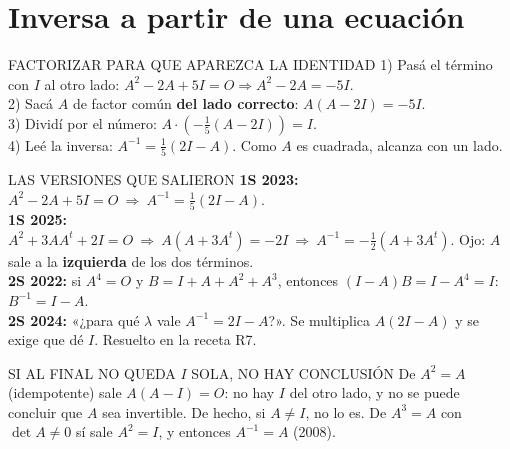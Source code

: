 \section{Inversa a partir de una ecuación}
\begin{metodo}{FACTORIZAR PARA QUE APAREZCA LA IDENTIDAD}
1) Pasá el término con $I$ al otro lado: $A^2-2A+5I=O\Rightarrow A^2-2A=-5I$.\\
2) Sacá $A$ de factor común \textbf{del lado correcto}: $A(A-2I)=-5I$.\\
3) Dividí por el número: $A\cdot\left(-\frac15(A-2I)\right)=I$.\\
4) Leé la inversa: $A^{-1}=\frac15(2I-A)$. Como $A$ es cuadrada, alcanza con un lado.
\end{metodo}
\begin{memo}{LAS VERSIONES QUE SALIERON}
\textbf{1S 2023:} $A^2-2A+5I=O\ \Rightarrow\ A^{-1}=\frac15(2I-A)$.\\
\textbf{1S 2025:} $A^2+3AA^t+2I=O\ \Rightarrow\ A(A+3A^t)=-2I\ \Rightarrow\ A^{-1}=-\frac12(A+3A^t)$. Ojo: $A$ sale a la \textbf{izquierda} de los dos términos.\\
\textbf{2S 2022:} si $A^4=O$ y $B=I+A+A^2+A^3$, entonces $(I-A)B=I-A^4=I$: \ $B^{-1}=I-A$.\\
\textbf{2S 2024:} «¿para qué $\lambda$ vale $A^{-1}=2I-A$?». Se multiplica $A(2I-A)$ y se exige que dé $I$. Resuelto en la receta R7.
\end{memo}
\begin{trampa}{SI AL FINAL NO QUEDA $I$ SOLA, NO HAY CONCLUSIÓN}
De $A^2=A$ (idempotente) sale $A(A-I)=O$: no hay $I$ del otro lado, y no se puede concluir que $A$ sea invertible. De hecho, si $A\neq I$, no lo es. De $A^3=A$ con $\det A\neq0$ sí sale $A^2=I$, y entonces $A^{-1}=A$ (2008).
\end{trampa}

